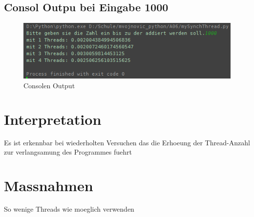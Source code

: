 \subsection{Consol Outpu bei Eingabe 1000}
\begin{figure}[!h]
	\begin{center}
		\includegraphics[width=0.7\linewidth]{images/consolOutput.png}
		\caption{Consolen Output}
		\label{broker}
	\end{center}
\end{figure}

\section{Interpretation}

Es ist erkennbar bei wiederholten Versuchen das die Erhoeung der Thread-Anzahl zur verlangsamung des Programmes fuehrt

\section{Massnahmen}

So wenige Threads wie moeglich verwenden